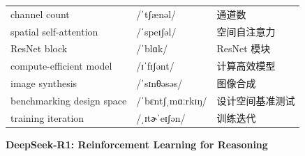 \documentclass[UTF8,12pt,a4paper]{ctexart}
\providecommand{\zh}[1]{#1}
\begin{document}
\begin{tabular*}{\textwidth}{@{\extracolsep{\fill}}lll@{}}
channel count & {\ipafont /ˈtʃænəl/} & \zh{通道数} \\
spatial self-attention & {\ipafont /ˈspeɪʃəl/} & \zh{空间自注意力} \\
ResNet block & {\ipafont /ˈblɑk/} & \zh{ResNet 模块} \\
compute-efficient model & {\ipafont /ɪˈfɪʃənt/} & \zh{计算高效模型} \\
image synthesis & {\ipafont /ˈsɪnθəsəs/} & \zh{图像合成} \\
benchmarking design space & {\ipafont /ˈbɛntʃˌmɑːrkɪŋ/} & \zh{设计空间基准测试} \\
training iteration & {\ipafont /ˌɪtɚˈeɪʃən/} & \zh{训练迭代} \\
\bottomrule
\end{tabular*}

\newpage

\begin{center}
    {\Large\bfseries DeepSeek-R1: Reinforcement Learning for Reasoning}
\end{center}
\end{document}
